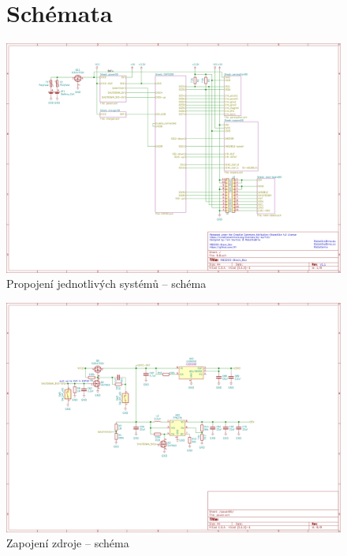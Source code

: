 \begin{figure}
	\section{Schémata}
    \centering
    \includegraphics[width=0.93\textheight, angle=90]{kapitoly/ctvrta_elektronicka_varianta/E4_zapojeni/B.B.png}
    \caption{Propojení jednotlivých systémů -- schéma}
    \label{fig:E4-sch_B.B}
\end{figure}
\begin{figure}
    \centering
    \includegraphics[width=0.93\textheight, angle=90]{kapitoly/ctvrta_elektronicka_varianta/E4_zapojeni/zdroj.png}
    \caption{Zapojení zdroje -- schéma}
    \label{fig:E4-sch_zdroj}
\end{figure}
